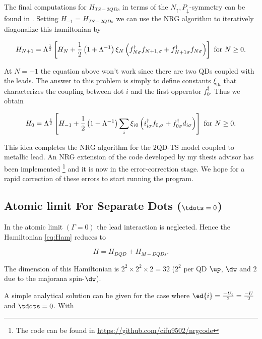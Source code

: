 The final computations for $H_{TS-2QDs}$ in terms of the $N_{\uparrow},P_{\downarrow}$-symmetry
can be found in .
Setting $H_{-1}=H_{TS-2QDs}$ we can use the NRG algorithm 
to iteratively diagonalize this hamiltonian by 

\[
H_{N+1}=\Lambda^{\frac{1}{2}}\left[H_{N}+\frac{1}{2}\left(1+\Lambda^{-1}\right)\xi_{N}\left(f_{N\sigma}^{\dagger}f_{N+1,\sigma}+f_{N+1\sigma}^{\dagger}f_{N\sigma}\right)\right]\ \mbox{for \ensuremath{N\geq0}}.
\]


At $N=-1$ the equation above won't work since there are two QDs coupled
with the leads. The answer to this problem is simply to define constants
$\xi_{0i}$ that characterizes the coupling between dot $i$ and the
first opperator $f_{0}^{\dagger}.$ Thus we obtain 

\[
H_{0}=\Lambda^{\frac{1}{2}}\left[H_{-1}+\frac{1}{2}\left(1+\Lambda^{-1}\right)\sum_{i}\xi_{i0}\left(i_{i\sigma}^{\dagger}f_{0,\sigma}+f_{0\sigma}^{\dagger}d_{i\sigma}\right)\right]\ \mbox{for \ensuremath{N\geq0}}.
\]


This idea completes the NRG algorithm for the $2$QD-TS model coupled
to metallic lead. An NRG extension of the code developed by my thesis
advisor has been implemented \footnote{The code can be found in \url{https://github.com/cifu9502/nrgcode}}
and it is now in the error-correction stage. We hope for a rapid correction
of these errors to start running the program. 



\subsection{Atomic limit For Separate Dots ($\tdots=0$)}
\label{sec:AtomicLimit}


In the atomic limit $(\Gamma = 0)$ the lead interaction is neglected. Hence the Hamiltonian \eqref{eq:Ham} reduces to 

    \begin{equation}
        H=H_{DQD}+H_{M-DQDs}.
    \end{equation}
    
The dimension of this Hamiltonian is $2^2\times2^2\times 2 =32$ ($2^2$ per QD $\up$, $\dw$ and $2$ due to the majorana spin-$\dw$). 

A simple analytical solution can be given for the case where  $\ed{i}=\frac{-U_i}{2}=\frac{-U}{2}$ and $\tdots = 0$. With

